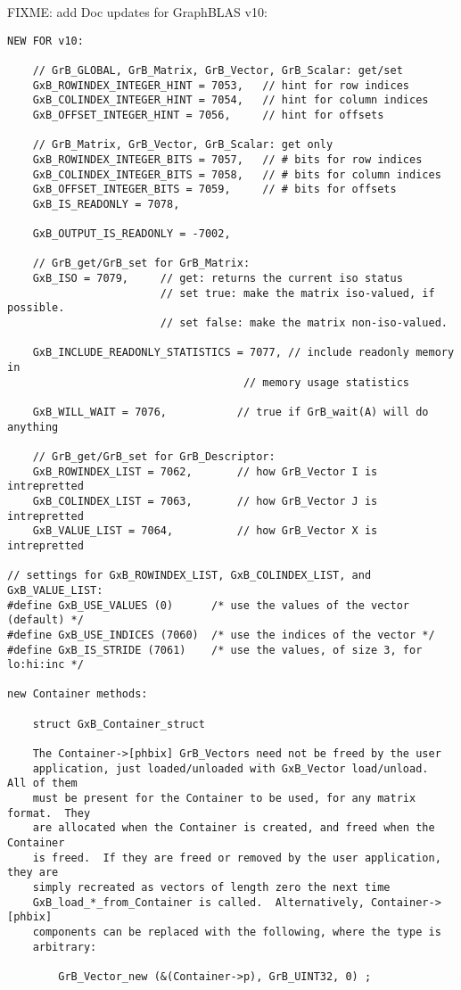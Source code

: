 
\newpage
\begin{note}
FIXME: add Doc updates for GraphBLAS v10:   %
\end{note}

\begin{verbatim}
NEW FOR v10:

    // GrB_GLOBAL, GrB_Matrix, GrB_Vector, GrB_Scalar: get/set
    GxB_ROWINDEX_INTEGER_HINT = 7053,   // hint for row indices
    GxB_COLINDEX_INTEGER_HINT = 7054,   // hint for column indices
    GxB_OFFSET_INTEGER_HINT = 7056,     // hint for offsets

    // GrB_Matrix, GrB_Vector, GrB_Scalar: get only
    GxB_ROWINDEX_INTEGER_BITS = 7057,   // # bits for row indices
    GxB_COLINDEX_INTEGER_BITS = 7058,   // # bits for column indices
    GxB_OFFSET_INTEGER_BITS = 7059,     // # bits for offsets
    GxB_IS_READONLY = 7078,

    GxB_OUTPUT_IS_READONLY = -7002,

    // GrB_get/GrB_set for GrB_Matrix:
    GxB_ISO = 7079,     // get: returns the current iso status
                        // set true: make the matrix iso-valued, if possible.
                        // set false: make the matrix non-iso-valued.

    GxB_INCLUDE_READONLY_STATISTICS = 7077, // include readonly memory in
                                     // memory usage statistics

    GxB_WILL_WAIT = 7076,           // true if GrB_wait(A) will do anything

    // GrB_get/GrB_set for GrB_Descriptor:
    GxB_ROWINDEX_LIST = 7062,       // how GrB_Vector I is intrepretted
    GxB_COLINDEX_LIST = 7063,       // how GrB_Vector J is intrepretted
    GxB_VALUE_LIST = 7064,          // how GrB_Vector X is intrepretted

// settings for GxB_ROWINDEX_LIST, GxB_COLINDEX_LIST, and GxB_VALUE_LIST:
#define GxB_USE_VALUES (0)      /* use the values of the vector (default) */
#define GxB_USE_INDICES (7060)  /* use the indices of the vector */
#define GxB_IS_STRIDE (7061)    /* use the values, of size 3, for lo:hi:inc */

new Container methods:

    struct GxB_Container_struct

    The Container->[phbix] GrB_Vectors need not be freed by the user
    application, just loaded/unloaded with GxB_Vector load/unload.  All of them
    must be present for the Container to be used, for any matrix format.  They
    are allocated when the Container is created, and freed when the Container
    is freed.  If they are freed or removed by the user application, they are
    simply recreated as vectors of length zero the next time
    GxB_load_*_from_Container is called.  Alternatively, Container->[phbix]
    components can be replaced with the following, where the type is
    arbitrary:

        GrB_Vector_new (&(Container->p), GrB_UINT32, 0) ;


\end{verbatim}


